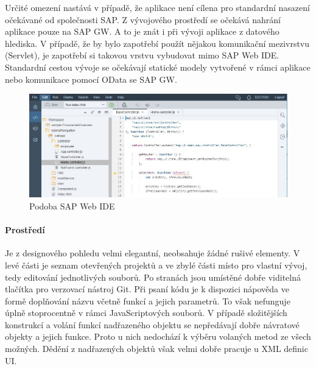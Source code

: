 \documentclass[thesis=M,czech]{FITthesis}[2012/06/26]
\begin{document}
Určité omezení nastává v případě, že aplikace není cílena pro standardní nasazení očekávané od společnosti SAP. Z vývojového prostředí se očekává nahrání aplikace pouze na SAP GW. A to je znát i při vývoji aplikace z datového hlediska. V případě, že by bylo zapotřebí použít nějakou komunikační mezivrstvu (Servlet), je zapotřebí si takovou vrstvu vybudovat mimo SAP Web IDE. Standardní cestou vývoje se očekávají statické modely vytvořené v rámci aplikace nebo komunikace pomocí OData se SAP GW. 
\begin{figure}[H]
	\centering
	\includegraphics[width=1\textwidth]{images/web_ide_design}
	\caption{Podoba SAP Web IDE}
	\label{img:web_ide_design}
\end{figure}
\paragraph{Prostředí} Je z designového pohledu velmi elegantní, neobsahuje žádné rušivé elementy. V levé části je seznam otevřených projektů a ve zbylé části místo pro vlastní vývoj, tedy editování jednotlivých souborů. Po stranách jsou umístěné dobře viditelná tlačítka pro verzovací nástroj Git. Při psaní kódu je k dispozici nápověda ve formě doplňování názvu včetně funkcí a jejich parametrů. To však nefunguje úplně stoprocentně v rámci JavaScriptových souborů. V případě složitějších konstrukcí a volání funkcí nadřazeného objektu se nepředávají dobře návratové objekty a jejich funkce. Proto u nich nedochází k výběru volaných metod ze všech možných. Dědění z nadřazených objektů však velmi dobře pracuje u XML definic UI. 
\end{document}
